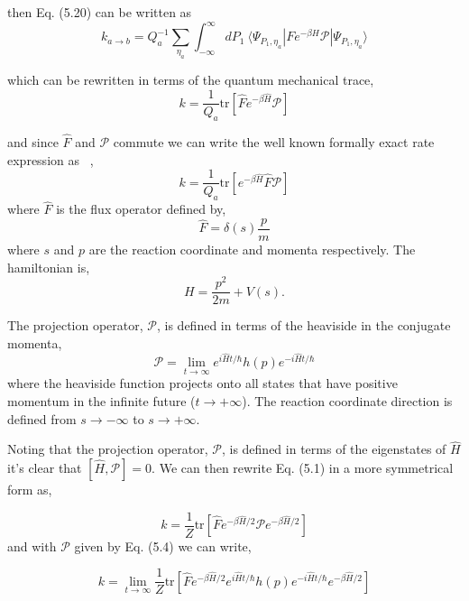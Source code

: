 \documentclass[phd,tocprelim]{cornell}
\begin{document}
then Eq. (5.20) can be written as 
\begin{equation}
k_{a\to b} = Q_{a}^{-1}\sum_{\eta_a} \int_{-\infty}^{\infty} dP_1 \ \langle \Psi_{P_1, \eta_a}|F e^{-\beta H}\mathcal{P} | \Psi_{P_1, \eta_a} \rangle
\end{equation}

which can be rewritten in terms of the quantum mechanical trace, 
\begin{equation}
k = \frac{1}{Q_a}\textrm{tr}[ \hat{F}e^{-\beta \hat{H}} \mathcal{P}]
\end{equation}


and since  $\hat{F}$ and  $\mathcal{P}$ commute we can write the well known formally exact rate expression as ~\cite{MILLER1974,TROMP1983}, 
\begin{equation}
k = \frac{1}{Q_a}\textrm{tr}[e^{-\beta \hat{H}} \hat{F} \mathcal{P}]
\end{equation}
 where  $\hat{F}$ is the flux operator defined by,
 \begin{equation}
 \hat{F}=\delta (s)\frac{p}{m}
 \end{equation}
  where $s$ and $p$ are the reaction coordinate and momenta respectively.
 The hamiltonian is, 
 \begin{equation}
 H= \frac{p^2}{2m} + V(s).
 \end{equation}

The projection operator,  $\mathcal{P}$, is defined in terms of the heaviside in the conjugate momenta,
\begin{equation}
\mathcal{P}=\lim_{t \to \infty} e^{i \hat{H} t/\hbar}h(p)e^{-i \hat{H} t/\hbar}
\end{equation}
where the heaviside function projects onto all states that have positive momentum in the infinite future ($t\to +\infty$). The reaction coordinate direction is defined from  $s\to -\infty$ to  $s\to +\infty$. 

Noting that the projection operator, $\mathcal{P}$, is defined in terms of the eigenstates of $\hat{H}$ it's clear that $[\hat{H}, \mathcal{P}]=0$. We can then rewrite Eq. (5.1) in a more symmetrical form as, 

\begin{equation}
k = \frac{1}{Z}\textrm{tr}[\hat{F}e^{-\beta \hat{H}/2}  \mathcal{P} e^{-\beta \hat{H}/2} ]
\end{equation}
 and with $\mathcal{P}$ given by Eq. (5.4) we can write,
 
 \begin{equation}
k = \lim_{t \to \infty}\frac{1}{Z}\textrm{tr}[\hat{F}e^{-\beta \hat{H}/2} e^{i \hat{H} t/\hbar}h(p)e^{-i \hat{H} t/\hbar} e^{-\beta \hat{H}/2} ]
\end{equation}
\end{document}
